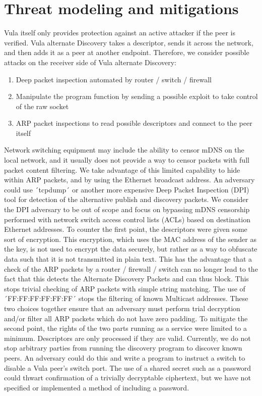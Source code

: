 \documentclass[a4paper,11pt]{report}
\begin{document}
\section{Threat modeling and mitigations}
Vula itself only provides protection against an active attacker if the peer is verified. Vula alternate Discovery takes a descriptor, sends it across the network, and then adds it as a peer at another endpoint. 
Therefore, we consider possible attacks on the receiver side of Vula alternate Discovery: 
\begin{enumerate}
    \item Deep packet inspection automated by router / switch / firewall
    \item Manipulate the program function by sending a possible exploit to take control of the raw socket 
    \item ARP packet inspections to read possible descriptors and connect to the peer itself
\end{enumerate}
Network switching equipment may include the ability to censor mDNS on the local network, and it usually does not provide a way to censor packets with full packet content filtering. We take advantage of this limited capability to hide within ARP packets, and by using the Ethernet broadcast address. An adversary could use ´tcpdump´ or another more expensive Deep Packet Inspection (DPI) tool for detection of the alternative publish and discovery packets. We consider the DPI adversary to be out of scope and focus on bypassing mDNS censorship performed with network switch access control lists (ACLs) based on destination Ethernet addresses.
\newline
\newline
To counter the first point, the descriptors were given some sort of encryption. This encryption, which uses the MAC address of the sender as the key, is not used to encrypt the data securely, but rather as a way to obfuscate data such that it is not transmitted in plain text. This has the advantage that a check of the ARP packets by a router / firewall / switch can no longer lead to the fact that this detects the Alternate Discovery Packets and can thus block.
This stops trivial checking of ARP packets with simple string matching. The use of ´FF:FF:FF:FF:FF:FF´ stops the filtering of known Multicast addresses. These two choices together ensure that an adversary must perform trial decryption and/or filter all ARP packets which do not have zero padding.
\newline
\newline
To mitigate the second point, the rights of the two parts running as a service were limited to a minimum. Descriptors are only processed if they are valid.
\newline
\newline
Currently, we do not stop arbitrary parties from running the discovery program to discover known peers. An adversary could do this and write a program to instruct a switch to disable a Vula peer's switch port. The use of a shared secret such as a password could thwart confirmation of a trivially decryptable ciphertext, but we have not specified or implemented a method of including a password.
\end{document}
